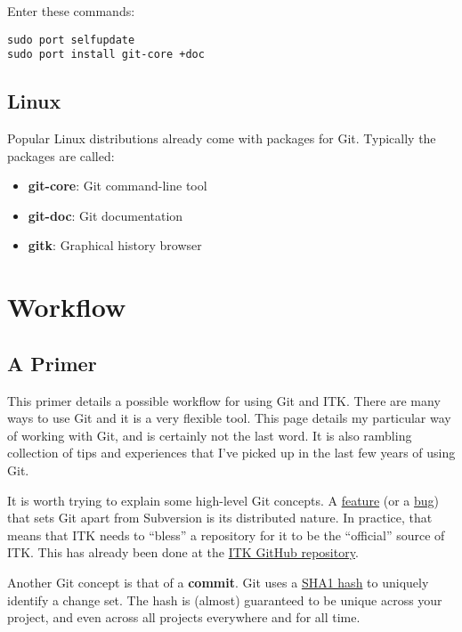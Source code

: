 Enter these commands:

\begin{verbatim}
sudo port selfupdate
sudo port install git-core +doc
\end{verbatim}


\subsection{Linux}
\label{subsec:Linux}

Popular Linux distributions already come with packages for Git. Typically the packages are called:
\begin{itemize}
\item \textbf{git-core}: Git command-line tool
\item \textbf{git-doc}: Git documentation
\item \textbf{gitk}: Graphical history browser
\end{itemize}


\section{Workflow}
\label{sec:Workflow}

\subsection{A Primer}
\label{subsec:APrimer}

This primer details a possible workflow for using Git and ITK. There are many
ways to use Git and it is a very flexible tool. This page details my particular
way of working with Git, and is certainly not the last word. It is also
rambling collection of tips and experiences that I've picked up in the last
few years of using Git.

It is worth trying to explain some high-level Git concepts. A
\href{http://carthik.net/blog/vault/2007/08/21/its-a-feature-not-a-bug/}{feature}
(or a
\href{https://blog.codinghorror.com/thats-not-a-bug-its-a-feature-request/}{bug})
that sets Git apart from Subversion is its distributed nature. In practice,
that means that ITK needs to ``bless'' a repository for it to be the
``official'' source of ITK. This has already been done at the
\href{https://github.com/InsightSoftwareConsortium/ITK}{ITK GitHub repository}.

Another Git concept is that of a \textbf{commit}. Git uses a
\href{https://en.wikipedia.org/wiki/SHA-1}{SHA1 hash} to uniquely identify a
change set. The hash is (almost) guaranteed to be unique across your project,
and even across all projects everywhere and for all time.

